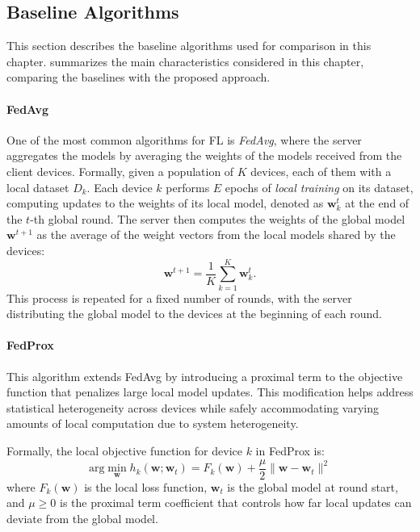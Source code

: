 \subsection{Baseline Algorithms}

This section describes the baseline algorithms used for comparison in this chapter.
%
 summarizes the main characteristics considered in this chapter, 
 comparing the baselines with the proposed approach.

\paragraph{FedAvg}
One of the most common algorithms for FL is \emph{FedAvg}, 
 where the server aggregates the models by averaging the weights of the models received from the client devices.
%
Formally, given a population of $K$ devices, each of them with a local dataset $D_k$.
Each device $k$ performs $E$ epochs of \emph{local training} on its dataset, 
 computing updates to the weights of its local model, denoted as $\mathbf{w}_k^t$ at 
 the end of the $t$-th global round.
%
The server then computes the weights of the global model $\mathbf{w}^{t+1}$ as the average of the weight 
 vectors from the local models shared by the devices:
\begin{equation}
  \mathbf{w}^{t+1} = \frac{1}{K} \sum_{k=1}^K \mathbf{w}_k^t.
\end{equation}\label{eq:fedavg}
%
This process is repeated for a fixed number of rounds, 
 with the server distributing the global model to the devices at the beginning of each round.

\paragraph{FedProx}
This algorithm extends FedAvg by introducing a proximal term to the objective 
 function that penalizes large local model updates.
%
This modification helps address statistical heterogeneity across devices while safely 
 accommodating varying amounts of local computation due to system heterogeneity.

Formally, the local objective function for device $k$ in FedProx is:
\begin{equation} 
  \text{arg}\min_{\mathbf{w}} h_k(\mathbf{w}; \mathbf{w}_t) = F_k(\mathbf{w}) + \frac{\mu}{2} \|\mathbf{w} - \mathbf{w}_t\|^2 
\end{equation}
where $F_k(\mathbf{w})$ is the local loss function, $\mathbf{w}_t$ is the global model at round start, 
 and $\mu \geq 0$ is the proximal term coefficient that controls how far local 
 updates can deviate from the global model.


